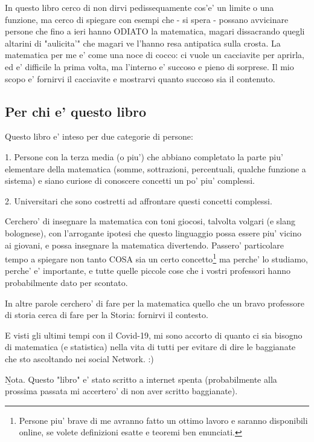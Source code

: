 In questo libro cerco di non dirvi pedissequamente cos'e' un limite o una funzione, ma cerco di spiegare con esempi che - si spera - possano avvicinare persone che fino a ieri 
hanno ODIATO la matematica, magari dissacrando quegli altarini di "aulicita'" che magari ve l'hanno resa antipatica sulla crosta. La matematica per me e' come una noce di cocco: ci 
vuole un cacciavite per aprirla, ed e' difficile la prima volta, ma l'interno e' succoso e pieno di sorprese. Il mio scopo e' fornirvi il cacciavite e mostrarvi quanto succoso sia il contenuto.

\subsection{Per chi e' questo libro}

Questo libro e' inteso per due categorie di persone: 

1. Persone con la terza media (o piu') che abbiano completato la parte piu' elementare della matematica (somme, sottrazioni, percentuali, qualche funzione a sistema) e siano
curiose di conoscere concetti un po' piu' complessi.

2. Universitari che sono costretti ad affrontare questi concetti complessi.

Cerchero' di insegnare la matematica con toni giocosi, talvolta volgari (e slang bolognese), con l'arrogante ipotesi che questo linguaggio possa essere piu' vicino ai giovani,
e possa insegnare la matematica divertendo. Passero' particolare tempo a spiegare non tanto COSA sia un certo concetto\footnote{Persone piu' brave di me avranno fatto un ottimo
lavoro e saranno disponibili online, se volete definizioni esatte e teoremi ben enunciati.} ma perche' lo studiamo, perche' e' importante, e tutte quelle piccole cose che i
vostri professori hanno probabilmente dato per scontato.

In altre parole cerchero' di fare per la matematica quello che un bravo professore di storia cerca di fare per la Storia: fornirvi il contesto.

E visti gli ultimi tempi con il Covid-19, mi sono accorto di quanto ci sia bisogno di matematica (e statistica) nella vita di tutti per evitare di dire le baggianate che sto ascoltando nei 
social Network. :)

\b{Nota}. Questo "libro" e' stato scritto a internet spenta (probabilmente alla prossima passata mi accertero' di non aver scritto baggianate).
